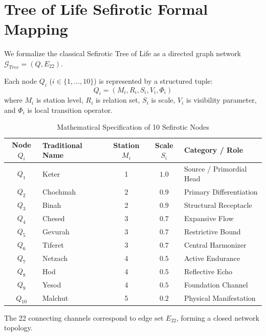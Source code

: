 \section{Tree of Life Sefirotic Formal Mapping}
\label{sec:tree_of_life_mapping}

We formalize the classical Sefirotic Tree of Life as a directed graph network $\mathcal{G}_{Tree} = (Q, E_{22})$.

\begin{definition}
Each node $Q_i$ ($i \in \{1, \dots, 10\}$) is represented by a structured tuple:
\begin{equation}
Q_i = (M_i, R_i, S_i, V_i, \Phi_i)
\end{equation}
where $M_i$ is station level, $R_i$ is relation set, $S_i$ is scale, $V_i$ is visibility parameter, and $\Phi_i$ is local transition operator.
\end{definition}

\begin{table}[h!]
\centering
\small
\begin{tabular}{c l c c l}
\toprule
\textbf{Node $Q_i$} & \textbf{Traditional Name} & \textbf{Station $M_i$} & \textbf{Scale $S_i$} & \textbf{Category / Role} \\
\midrule
$Q_1$ & Keter & 1 & $1.0$ & Source / Primordial Head \\
$Q_2$ & Chochmah & 2 & $0.9$ & Primary Differentiation \\
$Q_3$ & Binah & 2 & $0.9$ & Structural Receptacle \\
$Q_4$ & Chesed & 3 & $0.7$ & Expansive Flow \\
$Q_5$ & Gevurah & 3 & $0.7$ & Restrictive Bound \\
$Q_6$ & Tiferet & 3 & $0.7$ & Central Harmonizer \\
$Q_7$ & Netzach & 4 & $0.5$ & Active Endurance \\
$Q_8$ & Hod & 4 & $0.5$ & Reflective Echo \\
$Q_9$ & Yesod & 4 & $0.5$ & Foundation Channel \\
$Q_{10}$ & Malchut & 5 & $0.2$ & Physical Manifestation \\
\bottomrule
\end{tabular}
\caption{Mathematical Specification of 10 Sefirotic Nodes}
\end{table}

The 22 connecting channels correspond to edge set $E_{22}$, forming a closed network topology.
